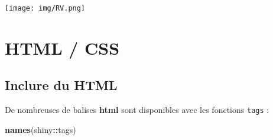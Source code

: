 \documentclass[
]{article}
\newenvironment{Shaded}{\begin{snugshade}}{\end{snugshade}}
\newcommand{\FunctionTok}[1]{\textcolor[rgb]{0.13,0.29,0.53}{\textbf{#1}}}
\newcommand{\NormalTok}[1]{#1}
\newcommand{\SpecialCharTok}[1]{\textcolor[rgb]{0.81,0.36,0.00}{\textbf{#1}}}
\begin{document}
\texttt{[image: img/RV.png]}

\hypertarget{html-css}{%
\section{HTML / CSS}\label{html-css}}

\hypertarget{inclure-du-html}{%
\subsection{Inclure du HTML}\label{inclure-du-html}}

De nombreuses de balises \textbf{html} sont disponibles avec les
fonctions \texttt{tags} :

\begin{Shaded}
\begin{Highlighting}[]
\FunctionTok{names}\NormalTok{(shiny}\SpecialCharTok{::}\NormalTok{tags)}
\end{Highlighting}
\end{Shaded}
\end{document}
